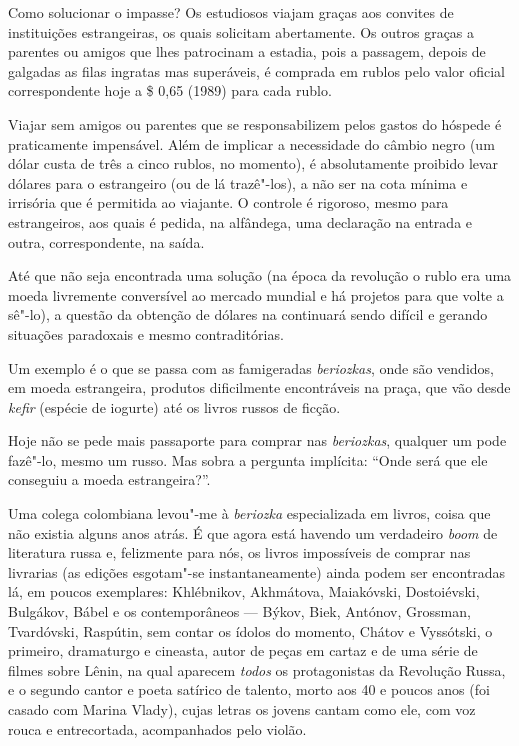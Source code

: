 Como solucionar o impasse? Os estudiosos viajam graças aos convites de instituições estrangeiras, os quais solicitam abertamente. Os outros graças a parentes ou amigos que lhes patrocinam a estadia, pois a passagem, depois de galgadas as filas ingratas mas superáveis, é comprada em rublos pelo valor oficial correspondente hoje a \$ 0,65 (1989) para cada rublo.

Viajar sem amigos ou parentes que se responsabilizem pelos gastos do hóspede é praticamente impensável. Além de implicar a necessidade do câmbio negro (um dólar custa de três a cinco rublos, no momento), é absolutamente proibido levar dólares para o estrangeiro (ou de lá trazê"-los), a não ser na cota mínima e irrisória que é permitida ao viajante. O controle é rigoroso, mesmo para estrangeiros, aos quais é pedida, na alfândega, uma declaração na entrada e outra, correspondente, na saída.

Até que não seja encontrada uma solução (na época da revolução o rublo era uma moeda livremente conversível ao mercado mundial e há projetos para que volte a sê"-lo), a questão da obtenção de dólares na  continuará sendo difícil e gerando situações paradoxais e mesmo contraditórias.

Um exemplo é o que se passa com as famigeradas \emph{beriozkas}, onde são vendidos, em moeda estrangeira, produtos dificilmente encontráveis na praça, que vão desde \emph{kefir} (espécie de iogurte) até os livros russos de ficção.

Hoje não se pede mais passaporte para comprar nas \emph{beriozkas}, qualquer um pode fazê"-lo, mesmo um russo. Mas sobra a pergunta
implícita: ``Onde será que ele conseguiu a moeda estrangeira?''.

Uma colega colombiana levou"-me à \emph{beriozka} especializada em livros, coisa que não existia alguns anos atrás. É que agora está havendo um verdadeiro \emph{boom} de literatura russa e, felizmente para nós, os livros impossíveis de comprar nas livrarias (as edições esgotam"-se instantaneamente) ainda podem ser encontradas lá, em poucos exemplares: Khlébnikov, Akhmátova, Maiakóvski, Dostoiévski, Bulgákov, Bábel e os contemporâneos --- Býkov, Biek, Antónov, Grossman, Tvardóvski, Raspútin, sem contar os ídolos do momento, Chátov e Vyssótski, o primeiro, dramaturgo e cineasta, autor de peças em cartaz e de uma série de filmes sobre Lênin, na qual aparecem \emph{todos} os protagonistas da Revolução Russa, e o segundo cantor e poeta satírico de talento, morto aos 40 e poucos anos (foi casado com Marina Vlady), cujas letras os jovens cantam como ele, com voz rouca e entrecortada, acompanhados pelo violão.

